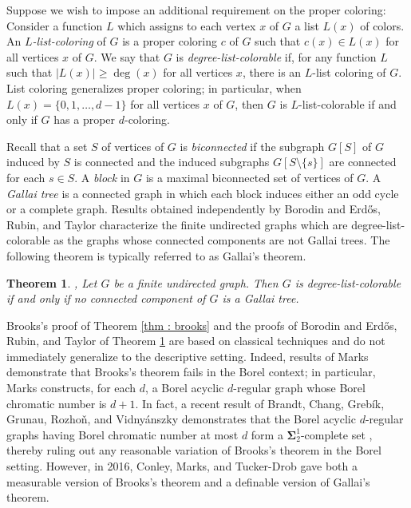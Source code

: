 \documentclass[psamsfonts]{amsart}
\newtheorem{thm}{Theorem}[section]
\theoremstyle{definition}
\theoremstyle{remark}
\numberwithin{equation}{section}
\begin{document}
Suppose we wish to impose an additional requirement on the proper coloring: Consider a function $L$ which assigns to each vertex $x$ of $G$ a list $L(x)$ of colors. An {\it $L$-list-coloring} of $G$ is a proper coloring $c$ of $G$ such that $c(x) \in L(x)$ for all vertices $x$ of $G$. We say that $G$ is {\it degree-list-colorable} if, for any function $L$ such that $\vert L(x) \vert \geq \deg(x)$ for all vertices $x$, there is an $L$-list coloring of $G$. List coloring generalizes proper coloring; in particular, when $L(x) = \{0, 1, \dots, d - 1\}$ for all vertices $x$ of $G$, then $G$ is $L$-list-colorable if and only if $G$ has a proper $d$-coloring. 

Recall that a set $S$ of vertices of $G$ is {\it biconnected} if the subgraph $G[S]$ of $G$ induced by $S$ is connected and the induced subgraphs $G[S \setminus \{s\}]$ are connected for each $s \in S$. A {\it block} in $G$ is a maximal biconnected set of vertices of $G$. A {\it Gallai tree} is a connected graph in which each block induces either an odd cycle or a complete graph. Results obtained independently by Borodin and Erd\H{o}s, Rubin, and Taylor characterize the finite undirected graphs which are degree-list-colorable as the graphs whose connected components are not Gallai trees. The following theorem is typically referred to as Gallai's theorem.

\begin{thm}
\label{thm : list coloring}
    \cite{borodin1977}, \cite{ert1979} Let $G$ be a finite undirected graph. Then $G$ is degree-list-colorable if and only if no connected component of $G$ is a Gallai tree.
\end{thm}

Brooks's proof of Theorem \ref{thm : brooks} and the proofs of Borodin and Erd\H{o}s, Rubin, and Taylor of Theorem \ref{thm : list coloring} are based on classical techniques and do not immediately generalize to the descriptive setting. Indeed, results of Marks \cite{marks2016} demonstrate that Brooks's theorem fails in the Borel context; in particular, Marks constructs, for each $d$, a Borel acyclic $d$-regular graph whose Borel chromatic number is $d + 1$. In fact, a recent result of Brandt, Chang, Grebík, Grunau, Rozhoň, and Vidnyánszky demonstrates that the Borel acyclic $d$-regular graphs having Borel chromatic number at most $d$ form a $\mathbf{\Sigma}^1_2$-complete set \cite{bcggrv2024}, thereby ruling out any reasonable variation of Brooks's theorem in the Borel setting. However, in 2016, Conley, Marks, and Tucker-Drob gave both a measurable version of Brooks's theorem and a definable version of Gallai's theorem.
\end{document}
